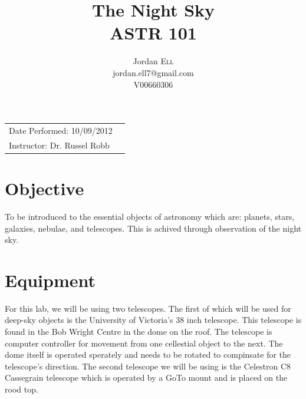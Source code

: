 \documentclass{article}
\title{The Night Sky \\ ASTR 101} %
\author{Jordan \textsc{Ell} \\ jordan.ell7@gmail.com \\ V00660306} %
\begin{document}
\maketitle %

\begin{tabular}{lr}
Date Performed: 10/09/2012\\ %
Instructor: Dr. Russel Robb %
\end{tabular}

\setlength\parindent{0pt} %

\renewcommand{\labelenumi}{\alph{enumi}.} %


\section{Objective}

To be introduced to the essential objects of astronomy which are: planets, stars, galaxies, nebulae, and telescopes. This is
achived through observation of the night sky.\\
 

\section{Equipment}

For this lab, we will be using two telescopes. The first of which will be used for deep-sky objects is the University of Victoria's 
38 inch telescope. This telescope is found in the Bob Wright Centre in the dome on the roof. The telescope is computer
controller for movement from one cellestial object to the next. The dome itself is operated sperately and needs to be 
rotated to compinsate for the telescope's direction. The second telescope we will be using is the Celestron C8 Cassegrain
telescope which is operated by a GoTo mount and is placed on the rood top.\\
\end{document}
